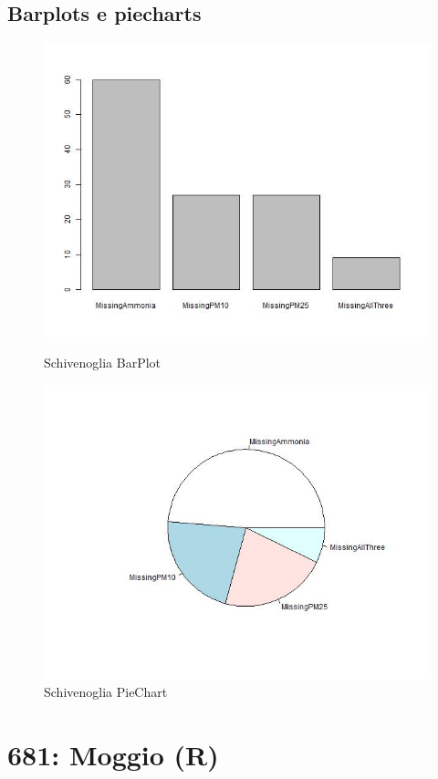 \documentclass{article}
\begin{document}
\subsection{Barplots e piecharts}
\begin{figure}[H]
  \centering 
  \includegraphics[scale = 0.4]{Picture/Barplots e piecharts/Schivenoglia BarPlotMV.jpeg}
  \caption{Schivenoglia BarPlot}
  \centering
  \centering 
  \includegraphics[scale = 0.4]{Picture/Barplots e piecharts/Schivenoglia PieChartMV.jpeg}
  \caption{Schivenoglia PieChart}
  \centering
\end{figure}

\section{681: Moggio (R)}
\end{document}
